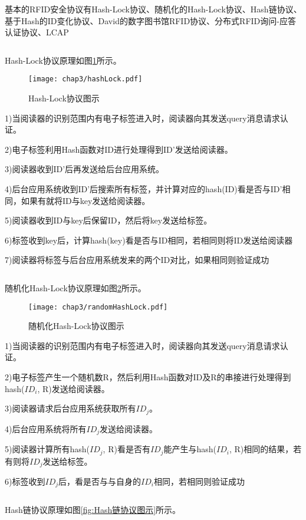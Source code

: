 基本的RFID安全协议有Hash-Lock协议、随机化的Hash-Lock协议、Hash链协议、基于Hash的ID变化协议、David的数字图书馆RFID协议、分布式RFID询问-应答认证协议、LCAP

\[\]

Hash-Lock协议原理如图\ref{fig:Hash-Lock协议图示}所示。

\begin{figure}[!htp]
	\centering
	\texttt{[image: chap3/hashLock.pdf]}
	\caption{Hash-Lock协议图示}\label{fig:Hash-Lock协议图示}
\end{figure}

1)当阅读器的识别范围内有电子标签进入时，阅读器向其发送query消息请求认证。

2)电子标签利用Hash函数对ID进行处理得到ID'发送给阅读器。

3)阅读器收到ID'后再发送给后台应用系统。

4)后台应用系统收到ID'后搜索所有标签，并计算对应的hash(ID)看是否与ID'相同，如果有就将ID与key发送给阅读器。

5)阅读器收到ID与key后保留ID，然后将key发送给标签。

6)标签收到key后，计算hash(key)看是否与ID相同，若相同则将ID发送给阅读器

7)阅读器将标签与后台应用系统发来的两个ID对比，如果相同则验证成功

\[\]

随机化Hash-Lock协议原理如图\ref{fig:随机化Hash-Lock协议图示}所示。

\begin{figure}[!htp]
	\centering
	\texttt{[image: chap3/randomHashLock.pdf]}
	\caption{随机化Hash-Lock协议图示}\label{fig:随机化Hash-Lock协议图示}
\end{figure}

1)当阅读器的识别范围内有电子标签进入时，阅读器向其发送query消息请求认证。

2)电子标签产生一个随机数R，然后利用Hash函数对ID及R的串接进行处理得到hash($ID_{i}$, R)发送给阅读器。

3)阅读器请求后台应用系统获取所有$ID_{j}$。

4)后台应用系统将所有$ID_{j}$发送给阅读器。

5)阅读器计算所有hash($ID_{j}$, R)看是否有$ID_{j}$能产生与hash($ID_{i}$, R)相同的结果，若有则将$ID_{j}$发送给标签。

6)标签收到$ID_{j}$后，看是否与与自身的$ID_{i}$相同，若相同则验证成功

\[\]

Hash链协议原理如图\ref{fig:Hash链协议图示}所示。

